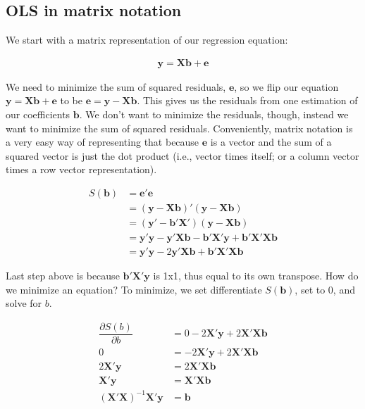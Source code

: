 \documentclass[a4paper,12pt]{article}
\newcommand{\matr}[1]{\mathbf{#1}}
\begin{document}
\subsection{OLS in matrix notation}


We start with a matrix representation of our regression equation:

\begin{align*}
\matr{y} = \matr{X} \matr{b} + \matr{e}
\end{align*}

We need to minimize the sum of squared residuals, $\matr{e}$, so we flip our equation $\matr{y} = \matr{X} \matr{b} + \matr{e}$ to be $\matr{e} = \matr{y} - \matr{X} \matr{b}$. This gives us the residuals from one estimation of our coefficients $\matr{b}$. We don't want to minimize the residuals, though, instead we want to minimize the sum of squared residuals. Conveniently, matrix notation is a very easy way of representing that because $\matr{e}$ is a vector and the sum of a squared vector is just the dot product (i.e., vector times itself; or a column vector times a row vector representation).


\begin{align*}
S(\matr{b}) & = \matr{e}'\matr{e}\\
  & = (\matr{y} - \matr{X} \matr{b})'(\matr{y} - \matr{X} \matr{b})\\
  & = (\matr{y}' - \matr{b}'\matr{X}')(\matr{y} - \matr{X} \matr{b})\\
  & = \matr{y}'\matr{y} - \matr{y}'\matr{X}\matr{b} - \matr{b}'\matr{X}'\matr{y} + \matr{b}'\matr{X}'\matr{X}\matr{b}\\
  & = \matr{y}'\matr{y} - 2\matr{y}'\matr{X}\matr{b} + \matr{b}'\matr{X}'\matr{X}\matr{b}
\end{align*}

Last step above is because $\matr{b}'\matr{X}'\matr{y}$ is 1x1, thus equal to its own transpose. How do we minimize an equation? To minimize, we set differentiate $S(\matr{b})$, set to 0, and solve for $b$.

\begin{align*}
\dfrac{\partial S(b)}{\partial b} & = 0 - 2\matr{X}'\matr{y} + 2 \matr{X}'\matr{X}\matr{b}\\
0 & = - 2\matr{X}'\matr{y} + 2 \matr{X}'\matr{X}\matr{b}\\
2\matr{X}'\matr{y} & = 2 \matr{X}'\matr{X}\matr{b}\\
\matr{X}'\matr{y} & = \matr{X}'\matr{X}\matr{b}\\
(\matr{X}'\matr{X})^{-1} \matr{X}'\matr{y} & = \matr{b}\\
\end{align*}
\end{document}
